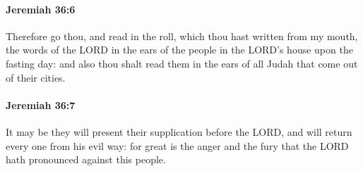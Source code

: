 		\paragraph{Jeremiah 36:6} %
			\label{JEREMIAH-36-6}

			Therefore go thou, and read in the roll, which thou hast written from my mouth, the words of the LORD in the ears of the people in the LORD’s house upon the fasting day: and also thou shalt read them in the ears of all Judah that come out of their cities.


		\paragraph{Jeremiah 36:7} %
			\label{JEREMIAH-36-7}

			It may be they will present their supplication before the LORD, and will return every one from his evil way: for great is the anger and the fury that the LORD hath pronounced against this people.

